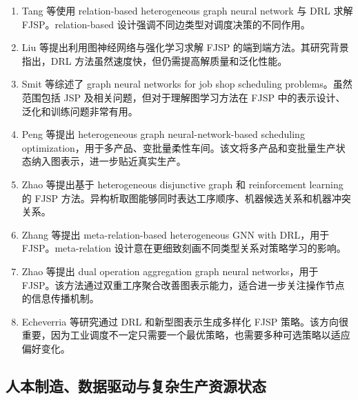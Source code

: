 \documentclass[UTF8,a4paper,11pt]{ctexart}
\begin{document}
\begin{enumerate}[label=\textbf{L\arabic*.},leftmargin=3em]
\item Tang 等使用 relation-based heterogeneous graph neural network 与 DRL 求解 FJSP\cite{Tang2024HGNNR}。relation-based 设计强调不同边类型对调度决策的不同作用。

\item Liu 等提出利用图神经网络与强化学习求解 FJSP 的端到端方法\cite{Liu2025GNN}。其研究背景指出，DRL 方法虽然速度快，但仍需提高解质量和泛化性能。

\item Smit 等综述了 graph neural networks for job shop scheduling problems\cite{Smit2025GNNReview}。虽然范围包括 JSP 及相关问题，但对于理解图学习方法在 FJSP 中的表示设计、泛化和训练问题非常有用。

\item Peng 等提出 heterogeneous graph neural-network-based scheduling optimization，用于多产品、变批量柔性车间\cite{Peng2025HGNN}。该文将多产品和变批量生产状态纳入图表示，进一步贴近真实生产。

\item Zhao 等提出基于 heterogeneous disjunctive graph 和 reinforcement learning 的 FJSP 方法\cite{Zhao2025HDG}。异构析取图能够同时表达工序顺序、机器候选关系和机器冲突关系。

\item Zhang 等提出 meta-relation-based heterogeneous GNN with DRL，用于 FJSP\cite{Zhang2025MetaRelation}。meta-relation 设计意在更细致刻画不同类型关系对策略学习的影响。

\item Zhao 等提出 dual operation aggregation graph neural networks，用于 FJSP\cite{Zhao2025DOAGNN}。该方法通过双重工序聚合改善图表示能力，适合进一步关注操作节点的信息传播机制。

\item Echeverria 等研究通过 DRL 和新型图表示生成多样化 FJSP 策略\cite{Echeverria2025Diverse}。该方向很重要，因为工业调度不一定只需要一个最优策略，也需要多种可选策略以适应偏好变化。
\end{enumerate}

\subsection{人本制造、数据驱动与复杂生产资源状态}
\end{document}
